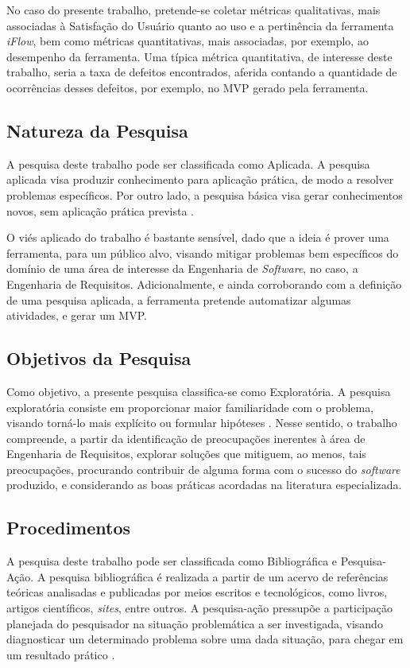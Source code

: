 No caso do presente trabalho, pretende-se coletar métricas qualitativas, mais associadas à Satisfação do Usuário quanto ao uso e a pertinência da ferramenta \textit{iFlow}, bem como métricas quantitativas, mais associadas, por exemplo, ao desempenho da ferramenta. Uma típica métrica quantitativa, de interesse deste trabalho, seria a taxa de defeitos encontrados, aferida contando a quantidade de ocorrências desses defeitos, por exemplo, no MVP gerado pela ferramenta.

\subsection{Natureza da Pesquisa}

A pesquisa deste trabalho pode ser classificada como Aplicada. A pesquisa aplicada visa produzir conhecimento para aplicação prática, de modo a resolver problemas específicos. Por outro lado, a pesquisa básica visa gerar conhecimentos novos, sem aplicação prática prevista \cite{gerhardt2009metodos}.

O viés aplicado do trabalho é bastante sensível, dado que a ideia é prover uma ferramenta, para um público alvo, visando mitigar problemas bem específicos do domínio de uma área de interesse da Engenharia de \textit{Software}, no caso, a Engenharia de Requisitos. Adicionalmente, e ainda corroborando com a definição de uma pesquisa aplicada, a ferramenta pretende automatizar algumas atividades, e gerar um MVP.

\subsection{Objetivos da Pesquisa}
Como objetivo, a presente pesquisa classifica-se como Exploratória. A pesquisa exploratória consiste em proporcionar maior familiaridade com o problema, visando torná-lo mais explícito ou formular hipóteses \cite{gil2002elaborar}. Nesse sentido, o trabalho compreende, a partir da identificação de preocupações inerentes à área de Engenharia de Requisitos, explorar soluções que mitiguem, ao menos, tais preocupações, procurando contribuir de alguma forma com o sucesso do \textit{software} produzido, e considerando as boas práticas acordadas na literatura especializada.

\subsection{Procedimentos}

A pesquisa deste trabalho pode ser classificada como Bibliográfica e Pesquisa-Ação. A pesquisa bibliográfica é realizada a partir de um acervo de referências teóricas analisadas e publicadas por meios escritos e tecnológicos, como livros, artigos científicos, \textit{sites}, entre outros. A pesquisa-ação pressupõe a participação planejada do pesquisador na situação problemática a ser investigada, visando diagnosticar um determinado problema sobre uma dada situação, para chegar em um resultado prático \cite{gil2002elaborar}.


